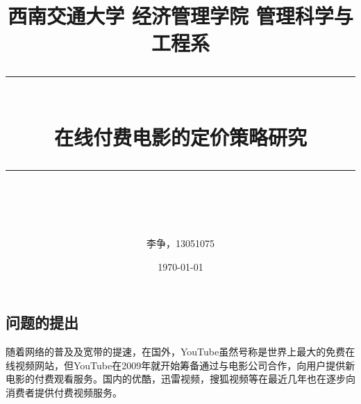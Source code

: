 \documentclass[paper=a4, fontsize=10.5pt]{scrartcl} %
\numberwithin{equation}{section} %
\numberwithin{figure}{section} %
\numberwithin{table}{section} %
\begin{document}
\begin{CJK}{UTF8}{gbsn}%
\CJKindent
\newtheorem{theorem}{{定理}} 
\newtheorem{proposition}{{命题}} 
\newtheorem{lemma}{{引理}} 
\newtheorem{corollary}{{推论}}[theorem] 
\newtheorem{definition}{{定义}} 
\newtheorem{example}{{例}} 







\sffamily
\newcommand{\horrule}[1]{\rule{\linewidth}{#1}} %

\title{	
\normalfont \normalsize 
\textsc{西南交通大学 经济管理学院 管理科学与工程系} \\ [25pt] %
\horrule{0.5pt} \\[0.4cm] %
\huge 在线付费电影的定价策略研究 \\ %
\horrule{2pt} \\[0.5cm] %
}

\author{李争，13051075} %

\date{\normalsize\today} %



\maketitle %


\section{问题的提出}
随着网络的普及及宽带的提速，在国外，YouTube虽然号称是世界上最大的免费在线视频网站，但YouTube在2009年就开始筹备通过与电影公司合作，向用户提供新电影的付费观看服务。国内的优酷，迅雷视频，搜狐视频等在最近几年也在逐步向消费者提供付费视频服务。


\end{CJK}
\end{document}
